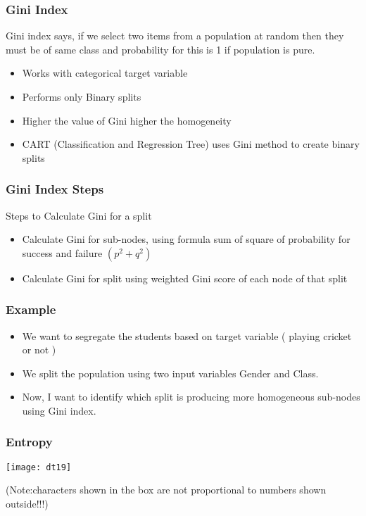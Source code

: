 \begin{frame}[fragile]\frametitle{Gini Index}
Gini index says, if we select two items from a population at random then they must be of same class and probability for this is 1 if population is pure.
\begin{itemize}
\item Works with categorical target variable
\item Performs only Binary splits
\item Higher the value of Gini higher the homogeneity
\item CART (Classification and Regression Tree) uses Gini method to create binary splits
\end{itemize}
\end{frame}

\begin{frame}[fragile]\frametitle{Gini Index Steps}
Steps to Calculate Gini for a split
\begin{itemize}
\item Calculate Gini for sub-nodes, using formula sum of square of probability for success and failure $(p^2 + q^2)$
\item Calculate Gini for split using weighted Gini score of each node of that split
\end{itemize}
\end{frame}

\begin{frame}[fragile]\frametitle{Example}
\begin{itemize}
\item We want to segregate the students based on target variable ( playing cricket or not )
\item We split the population using two input variables Gender and Class. 
\item Now, I want to identify which split is producing more homogeneous sub-nodes using Gini index.
\end{itemize}
\end{frame}

\begin{frame}[fragile]\frametitle{Entropy}
\begin{center}
\texttt{[image: dt19]}
\end{center}

(Note:characters shown in the box are not proportional to numbers shown outside!!!)
\end{frame}

